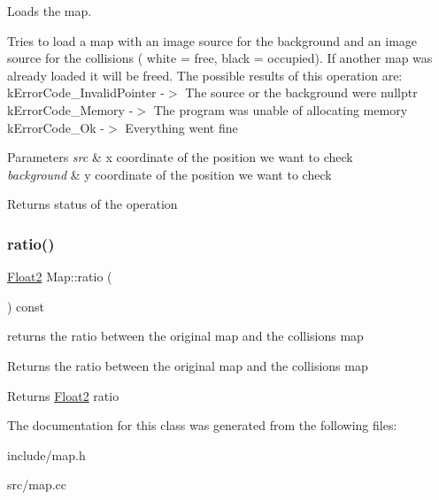 Loads the map. 

Tries to load a map with an image source for the background and an image source for the collisions ( white = free, black = occupied). If another map was already loaded it will be freed. The possible results of this operation are\+: k\+Error\+Code\+\_\+\+Invalid\+Pointer -\/$>$ The source or the background were nullptr k\+Error\+Code\+\_\+\+Memory -\/$>$ The program was unable of allocating memory k\+Error\+Code\+\_\+\+Ok -\/$>$ Everything went fine


\begin{DoxyParams}{Parameters}
{\em src} & x coordinate of the position we want to check \\
\hline
{\em background} & y coordinate of the position we want to check \\
\hline
\end{DoxyParams}
\begin{DoxyReturn}{Returns}
status of the operation 
\end{DoxyReturn}
\mbox{\label{class_map_ad27c66a5bfffc6aeb8c786b7edb19d22}} 
\subsubsection{\texorpdfstring{ratio()}{ratio()}}
{\footnotesize\ttfamily \mbox{\hyperlink{class_float2}{Float2}} Map\+::ratio (\begin{DoxyParamCaption}{ }\end{DoxyParamCaption}) const}



returns the ratio between the original map and the collisions map 

Returns the ratio between the original map and the collisions map

\begin{DoxyReturn}{Returns}
\mbox{\hyperlink{class_float2}{Float2}} ratio 
\end{DoxyReturn}


The documentation for this class was generated from the following files\+:\begin{DoxyCompactItemize}
\item 
include/map.\+h\item 
src/map.\+cc\end{DoxyCompactItemize}
